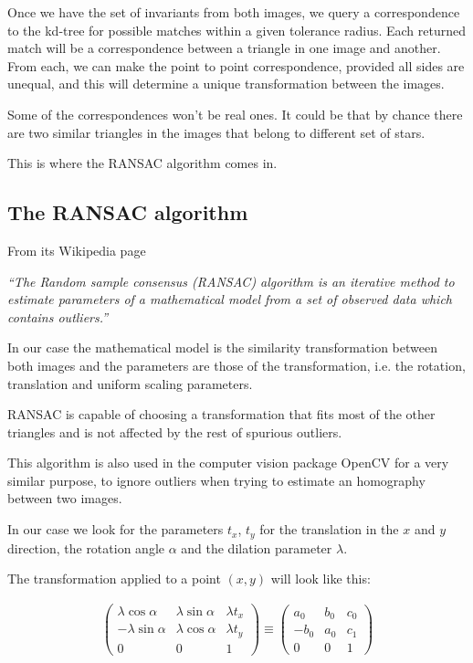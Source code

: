 Once we have the set of invariants from both images, we query a correspondence to the kd-tree for possible matches within a given tolerance radius. 
Each returned match will be a correspondence between a triangle in one image and another. 
From each, we can make the point to point correspondence, provided all sides are unequal, and this will determine a unique transformation between the images.

Some of the correspondences won't be real ones. It could be that by chance there are two similar triangles in the images that belong to different set of stars.

This is where the RANSAC algorithm comes in.

\subsection{The RANSAC algorithm}

From its Wikipedia page 

{\em ``The Random sample consensus (RANSAC) algorithm is an iterative method to estimate parameters of a mathematical model from a set of observed data which contains outliers.''}

In our case the mathematical model is the similarity transformation between both images and the parameters are those of the transformation, i.e. the rotation, translation and uniform scaling parameters.

RANSAC is capable of choosing a transformation that fits most of the other triangles and is not affected by the rest of spurious outliers. 

This algorithm is also used in the computer vision package OpenCV for a very similar purpose, to ignore outliers when trying to estimate an homography between two images. 

In our case we look for the parameters $t_x$, $t_y$ for the translation in the $x$ and $y$ direction, the rotation angle $\alpha$ and the dilation parameter $\lambda$.

The transformation applied to a point $(x,y)$ will look like this:

\begin{align*}
\left(
 \begin{array}{lll} 
 \lambda \cos \alpha & \lambda \sin \alpha& \lambda t_x \\
 - \lambda \sin \alpha & \lambda \cos \alpha& \lambda t_y \\
 0 & 0 & 1
 \end{array}
\right)
\equiv
\left(
 \begin{array}{lll} 
 a_0 & b_0 & c_0 \\
-b_0 & a_0 & c_1 \\
 0 & 0 & 1
 \end{array}
\right)
\end{align*}

